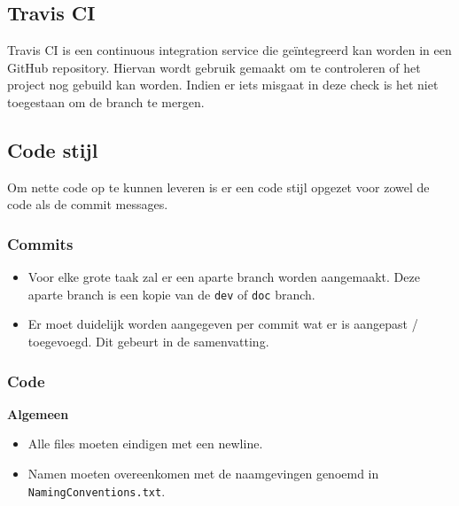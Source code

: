 \subsection{Travis CI}
Travis CI is een continuous integration service die geïntegreerd kan worden in
een GitHub repository. Hiervan wordt gebruik gemaakt om te controleren of het
project nog gebuild kan worden. Indien er iets misgaat in deze check is het
niet toegestaan om de branch te mergen.

\subsection{Code stijl}
Om nette code op te kunnen leveren is er een code stijl opgezet voor zowel 
de code als de commit messages.


\subsubsection{Commits}
\begin{itemize}
    \item Voor elke grote taak zal er een aparte branch worden aangemaakt. Deze 
          aparte branch is een kopie van de \texttt{dev} of \texttt{doc} branch.
    \item Er moet duidelijk worden aangegeven per commit wat er is aangepast / 
          toegevoegd. Dit gebeurt in de samenvatting.
\end{itemize}

\subsubsection{Code}
\textbf{Algemeen}

\begin{itemize}
  \item Alle files moeten eindigen met een newline.
  \item Namen moeten overeenkomen met de naamgevingen genoemd in 
        \texttt{NamingConventions.txt}.
\end{itemize}

